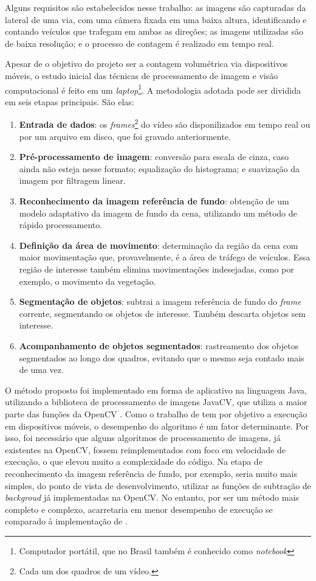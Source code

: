 Alguns requisitos são estabelecidos nesse trabalho: as imagens são capturadas da lateral de uma via, com uma câmera fixada em uma baixa altura, identificando e contando veículos que trafegam em ambas as direções; as imagens utilizadas são de baixa resolução; e o processo de contagem é realizado em tempo real.

Apesar de o objetivo do projeto ser a contagem volumétrica via dispositivos móveis, o estudo inicial das técnicas de processamento de imagem e visão computacional é feito em um \textit{laptop}\footnote{Computador portátil, que no Brasil também é conhecido como \textit{notebook}}. A metodologia adotada pode ser dividida em seis etapas principais. São elas:

\begin{enumerate}
  \item \textbf{Entrada de dados}: os \textit{frames}\footnote{Cada um dos quadros de um vídeo.} do vídeo são disponilizados em tempo real ou por um arquivo em disco, que foi gravado anteriormente.
  \item \textbf{Pré-processamento de imagem}: conversão para escala de cinza, caso ainda não esteja nesse formato; equalização do histograma; e suavização da imagem por filtragem linear.
  \item \textbf{Reconhecimento da imagem referência de fundo}: obtenção de um modelo adaptativo da imagem de fundo da cena, utilizando um método de rápido processamento.
  \item \textbf{Definição da área de movimento}: determinação da região da cena com maior movimentação que, provavelmente, é a área de tráfego de veículos. Essa região de interesse também elimina movimentações indesejadas, como por exemplo, o movimento da vegetação.
  \item \textbf{Segmentação de objetos}: subtrai a imagem referência de fundo do \textit{frame} corrente, segmentando os objetos de interesse. Também descarta objetos sem interesse.
  \item \textbf{Acompanhamento de objetos segmentados}: rastreamento dos objetos segmentados ao longo dos quadros, evitando que o mesmo seja contado mais de uma vez.
\end{enumerate}

O método proposto foi implementado em forma de aplicativo na linguagem Java, utilizando a biblioteca de processamento de imagens JavaCV, que utiliza a maior parte das funções da OpenCV \citep{opencv_library}. Como o trabalho de \cite{feitosa:2012:masther} tem por objetivo a execução em dispositivos móveis, o desempenho do algoritmo é um fator determinante. Por isso, foi necessário que alguns algoritmos de processamento de imagens, já existentes na OpenCV, fossem reimplementados com foco em velocidade de execução, o que elevou muito a complexidade do código. Na etapa de reconhecimento da imagem referência de fundo, por exemplo, seria muito mais simples, do ponto de vista de desenvolvimento, utilizar as funções de subtração de \textit{backgroud} já implementadas na OpenCV. No entanto, por ser um método mais completo e complexo, acarretaria em menor desempenho de execução se comparado à implementação de \cite{feitosa:2012:masther}.

